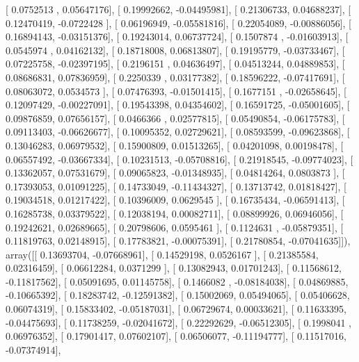 \documentclass{article}
\begin{document}
       [ 0.0752513 ,  0.05647176],
       [ 0.19992662, -0.04495981],
       [ 0.21306733,  0.04688237],
       [ 0.12470419, -0.0722428 ],
       [ 0.06196949, -0.05581816],
       [ 0.22054089, -0.00886056],
       [ 0.16894143, -0.03151376],
       [ 0.19243014,  0.06737724],
       [ 0.1507874 , -0.01603913],
       [ 0.0545974 ,  0.04162132],
       [ 0.18718008,  0.06813807],
       [ 0.19195779, -0.03733467],
       [ 0.07225758, -0.02397195],
       [ 0.2196151 ,  0.04636497],
       [ 0.04513244,  0.04889853],
       [ 0.08686831,  0.07836959],
       [ 0.2250339 ,  0.03177382],
       [ 0.18596222, -0.07417691],
       [ 0.08063072,  0.0534573 ],
       [ 0.07476393, -0.01501415],
       [ 0.1677151 , -0.02658645],
       [ 0.12097429, -0.00227091],
       [ 0.19543398,  0.04354602],
       [ 0.16591725, -0.05001605],
       [ 0.09876859,  0.07656157],
       [ 0.0466366 ,  0.02577815],
       [ 0.05490854, -0.06175783],
       [ 0.09113403, -0.06626677],
       [ 0.10095352,  0.02729621],
       [ 0.08593599, -0.09623868],
       [ 0.13046283,  0.06979532],
       [ 0.15900809,  0.01513265],
       [ 0.04201098,  0.00198478],
       [ 0.06557492, -0.03667334],
       [ 0.10231513, -0.05708816],
       [ 0.21918545, -0.09774023],
       [ 0.13362057,  0.07531679],
       [ 0.09065823, -0.01348935],
       [ 0.04814264,  0.0803873 ],
       [ 0.17393053,  0.01091225],
       [ 0.14733049, -0.11434327],
       [ 0.13713742,  0.01818427],
       [ 0.19034518,  0.01217422],
       [ 0.10396009,  0.0629545 ],
       [ 0.16735434, -0.06591413],
       [ 0.16285738,  0.03379522],
       [ 0.12038194,  0.00082711],
       [ 0.08899926,  0.06946056],
       [ 0.19242621,  0.02689665],
       [ 0.20798606,  0.0595461 ],
       [ 0.1124631 , -0.05879351],
       [ 0.11819763,  0.02148915],
       [ 0.17783821, -0.00075391],
       [ 0.21780854, -0.07041635]]), array([[ 0.13693704, -0.07668961],
       [ 0.14529198,  0.0526167 ],
       [ 0.21385584,  0.02316459],
       [ 0.06612284,  0.0371299 ],
       [ 0.13082943,  0.01701243],
       [ 0.11568612, -0.11817562],
       [ 0.05091695,  0.01145758],
       [ 0.1466082 , -0.08184038],
       [ 0.04869885, -0.10665392],
       [ 0.18283742, -0.12591382],
       [ 0.15002069,  0.05494065],
       [ 0.05406628,  0.06074319],
       [ 0.15833402, -0.05187031],
       [ 0.06729674,  0.00033621],
       [ 0.11633395, -0.04475693],
       [ 0.11738259, -0.02041672],
       [ 0.22292629, -0.06512305],
       [ 0.1998041 ,  0.06976352],
       [ 0.17901417,  0.07602107],
       [ 0.06506077, -0.11194777],
       [ 0.11517016, -0.07374914],
\end{document}
